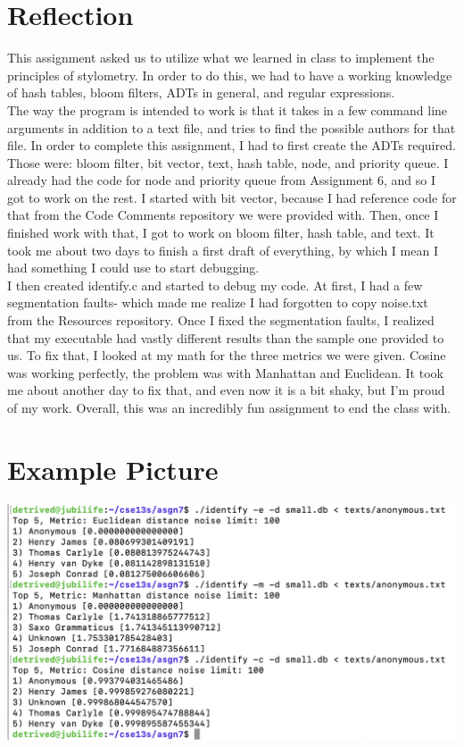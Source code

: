 \documentclass[12pt]{article}
\begin{document}
\section{Reflection}\label{ss:desc}
This assignment asked us to utilize what we learned in class to implement the principles of stylometry.
In order to do this, we had to have a working knowledge of hash tables, bloom filters, ADTs in general, and regular expressions.
\\The way the program is intended to work is that it takes in a few command 
line arguments in addition to a text file, and tries to find the possible authors for that file.
In order to complete this assignment, I had to first create the ADTs required. Those were:
bloom filter, bit vector, text, hash table, node, and priority queue.
I already had the code for node and priority queue from Assignment 6, and so I got to work on the rest.
I started with bit vector, because I had reference code for that from the Code Comments repository we were provided with.
Then, once I finished work with that, I got to work on bloom filter, hash table, and text. It took me about two days to finish
a first draft of everything, by which I mean I had something I could use to start debugging.
\\I then created identify.c and started to debug my code. At first, I had a few segmentation faults- which made me realize I had forgotten
to copy noise.txt from the Resources repository. 
Once I fixed the segmentation faults, I realized that my executable had vastly different results than the sample one provided to us.
To fix that, I looked at my math for the three metrics we were given. Cosine was working perfectly, the problem was with Manhattan and Euclidean.
It took me about another day to fix that, and even now it is a bit shaky, but I'm proud of my work. Overall, this was an incredibly fun assignment to end the class with.

\section{Example Picture}\label{ss:ex}
\includegraphics{ss}
\end{document}
